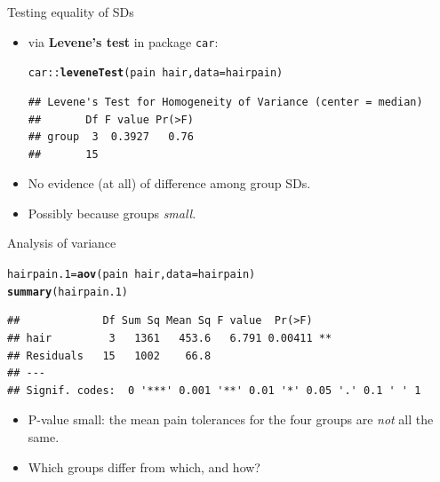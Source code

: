 \documentclass[unknownkeysallowed]{beamer}\usepackage[]{graphicx}\usepackage[]{color}
\makeatletter
\newcommand{\hlopt}[1]{\textcolor[rgb]{0,0,0}{#1}}%
\newcommand{\hlstd}[1]{\textcolor[rgb]{0.345,0.345,0.345}{#1}}%
\newcommand{\hlkwb}[1]{\textcolor[rgb]{0.69,0.353,0.396}{#1}}%
\newcommand{\hlkwc}[1]{\textcolor[rgb]{0.333,0.667,0.333}{#1}}%
\newcommand{\hlkwd}[1]{\textcolor[rgb]{0.737,0.353,0.396}{\textbf{#1}}}%
\newenvironment{kframe}{%
 \def\at@end@of@kframe{}%
 \ifinner\ifhmode%
  \def\at@end@of@kframe{\end{minipage}}%
  \begin{minipage}{\columnwidth}%
 \fi\fi%
 \def\FrameCommand##1{\hskip\@totalleftmargin \hskip-\fboxsep
 \colorbox{shadecolor}{##1}\hskip-\fboxsep
     \hskip-\linewidth \hskip-\@totalleftmargin \hskip\columnwidth}%
 \MakeFramed {\advance\hsize-\width
   \@totalleftmargin\z@ \linewidth\hsize
   \@setminipage}}%
 {\par\unskip\endMakeFramed%
 \at@end@of@kframe}
\newenvironment{knitrout}{}{} %
\makeatother
\begin{document}
\begin{frame}[fragile]{Testing equality of SDs}
  
  
  \begin{itemize}
  \item   via \textbf{Levene's test} in package \texttt{car}:

\begin{knitrout}\small
{}\color{fgcolor}\begin{kframe}
\begin{alltt}
\hlstd{car}\hlopt{::}\hlkwd{leveneTest}\hlstd{(pain}\hlopt{~}\hlstd{hair,}\hlkwc{data}\hlstd{=hairpain)}
\end{alltt}


{\ttfamily\noindent\color{warningcolor}{\#\# Warning in leveneTest.default(y = y, group = group, ...): group coerced to factor.}}\begin{verbatim}
## Levene's Test for Homogeneity of Variance (center = median)
##       Df F value Pr(>F)
## group  3  0.3927   0.76
##       15
\end{verbatim}
\end{kframe}
\end{knitrout}

\item No evidence (at all) of difference among group SDs.
\item Possibly because groups \emph{small}.
  \end{itemize}
  
\end{frame}

\begin{frame}[fragile]{Analysis of variance}
\begin{knitrout}\small
{}\color{fgcolor}\begin{kframe}
\begin{alltt}
\hlstd{hairpain.1}\hlkwb{=}\hlkwd{aov}\hlstd{(pain}\hlopt{~}\hlstd{hair,}\hlkwc{data}\hlstd{=hairpain)}
\hlkwd{summary}\hlstd{(hairpain.1)}
\end{alltt}
\begin{verbatim}
##             Df Sum Sq Mean Sq F value  Pr(>F)   
## hair         3   1361   453.6   6.791 0.00411 **
## Residuals   15   1002    66.8                   
## ---
## Signif. codes:  0 '***' 0.001 '**' 0.01 '*' 0.05 '.' 0.1 ' ' 1
\end{verbatim}
\end{kframe}
\end{knitrout}

\begin{itemize}
\item P-value small: the mean pain tolerances for the four groups are
  \emph{not} all the same.
\item Which groups differ from which, and how?
\end{itemize}
\end{frame}
\end{document}
